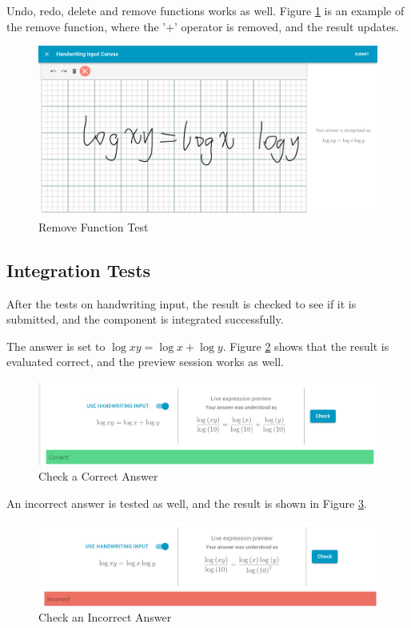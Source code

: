 \documentclass[12pt,twoside]{report}
\begin{document}
Undo, redo, delete and remove functions works as well. Figure \ref{fig:test-remove} is an example of the remove function, where the '+' operator is removed, and the result updates.
\begin{figure}[H]
    \centering
    \includegraphics[width=\linewidth, frame]{figures/test-remove.png}
    \caption{Remove Function Test}
    \label{fig:test-remove}
\end{figure}

\subsection*{Integration Tests}
After the tests on handwriting input, the result is checked to see if it is submitted, and the component is integrated successfully.

The answer is set to $\log x y=\log x+\log y$. Figure
\ref{fig:test-check-correct} shows that the result is evaluated correct, and the
preview session works as well.
\begin{figure}[H]
    \centering
    \includegraphics[width=\linewidth, frame]{figures/test-check-correct}
    \caption{Check a Correct Answer}
    \label{fig:test-check-correct}
\end{figure}

An incorrect answer is tested as well, and the result is shown in Figure \ref{fig:test-check-wrong}.
\begin{figure}[h]
    \centering
    \includegraphics[width=\linewidth, frame]{figures/test-check-wrong.png}
    \caption{Check an Incorrect Answer}
    \label{fig:test-check-wrong}
\end{figure}
\end{document}
